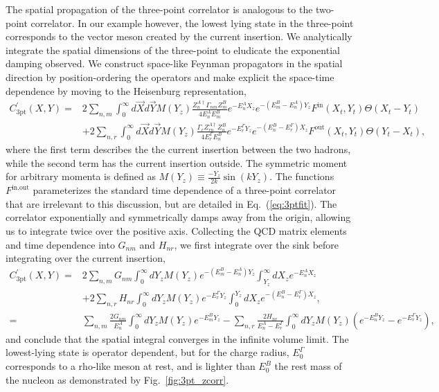 \documentclass{PoS}
\begin{document}
The spatial propagation of the three-point correlator is analogous to the two-point correlator.  In our example however, the lowest lying state in the three-point corresponds to the vector meson created by the current insertion. We analytically integrate the spatial dimensions of the three-point to eludicate the exponential damping observed. We construct space-like Feynman propagators in the spatial direction by position-ordering the operators and make explicit the space-time dependence by moving to the Heisenburg representation,
\begin{align}
C_{\text{3pt}}^\prime(X,Y) = &2\sum_{n,m}\int_{0}^{\infty}d\vec{X}d\vec{Y} M(Y_z)\frac{Z_n^{A\dagger}\Gamma_{nm}Z_m^B}{4E_n^AE_m^B}e^{-E_n^AX_z}e^{-(E_m^B-E_n^A)Y_z}F^{\text{in}}(X_t,Y_t)\Theta(X_t-Y_t)\nonumber\\
&+2\sum_{n,r}\int_{0}^{\infty}d\vec{X}d\vec{Y}M(Y_z) \frac{\Gamma_{r}Z_{rn}^{A\dagger}Z_n^B}{4E_r^\Gamma E_n^B}e^{-E_r^\Gamma Y_z}e^{-(E_n^B-E_r^\Gamma)X_z}F^{\text{out}}(X_t,Y_t)\Theta(Y_t-X_t),
\end{align}
where the first term describes the the current insertion between the two hadrons, while the second term has the current insertion outside. The symmetric moment for arbitrary momenta is defined as $M(Y_z)\equiv\frac{-Y_z}{2k}\sin{(kY_z)}$. The functions $F^{\text{in},\text{out}}$ parameterizes the standard time dependence of a three-point correlator that are irrelevant to this discussion, but are detailed in Eq.~(\ref{eq:3ptfit}). The correlator exponentially and symmetrically damps away from the origin, allowing us to integrate twice over the positive axis.	 Collecting the QCD matrix elements and time dependence into $G_{nm}$ and $H_{nr}$, we first integrate over the sink before integrating over the current insertion,
\begin{align}
C^\prime_{\text{3pt}}(X,Y) = &2\sum_{n,m}G_{nm}\int_0^\infty dY_z M(Y_z)e^{-(E_m^B-E_n^A)Y_z}\int_{Y_z}^\infty dX_z e^{-E_n^A X_z}\nonumber\\
&+2\sum_{n,r}H_{nr}\int_0^\infty dY_z M(Y_z)e^{-E_r^\Gamma Y_z}\int_0^{Y_z}dX_z e^{-(E_n^B-E_r^\Gamma)X_z},\nonumber\\
=&\sum_{n,m}\frac{2G_{nm}}{E_n^A}\int_0^\infty dY_z  M(Y_z)e^{-E_m^B Y_z} - \sum_{n,r}\frac{2H_{nr}}{E_n^A-E_r^\Gamma}\int_0^\infty dY_z  M(Y_z) \left(e^{-E_n^B Y_z}-e^{-E_r^\Gamma Y_z}\right),
\end{align}
and conclude that the spatial integral converges in the infinite volume limit. The lowest-lying state is operator dependent, but for the charge radius, $E_0^\Gamma$ corresponds to a rho-like meson at rest, and is lighter than $E_0^B$ the rest mass of the nucleon as demonstrated by Fig.~\ref{fig:3pt_zcorr}.
\end{document}
